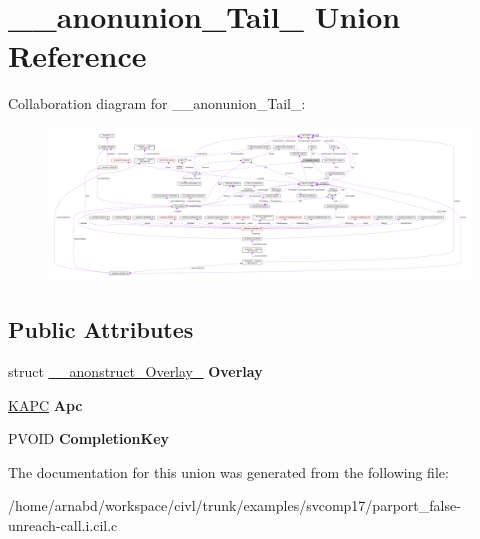 \hypertarget{union____anonunion__Tail__47}{}\section{\+\_\+\+\_\+anonunion\+\_\+\+Tail\+\_ Union Reference}
\label{union____anonunion__Tail__47}


Collaboration diagram for \+\_\+\+\_\+anonunion\+\_\+\+Tail\+\_\+:
\nopagebreak
\begin{figure}[H]
\begin{center}
\leavevmode
\includegraphics[width=350pt]{union____anonunion__Tail__47__coll__graph}
\end{center}
\end{figure}
\subsection*{Public Attributes}
\begin{DoxyCompactItemize}
\item 
\hypertarget{union____anonunion__Tail__47_a921275cd81526fb1bcd5b1021e25bfe4}{}struct \hyperlink{struct____anonstruct__Overlay__48}{\+\_\+\+\_\+anonstruct\+\_\+\+Overlay\+\_} {\bfseries Overlay}\label{union____anonunion__Tail__47_a921275cd81526fb1bcd5b1021e25bfe4}

\item 
\hypertarget{union____anonunion__Tail__47_aed65b12c9b60563abde1723652316ad5}{}\hyperlink{struct__KAPC}{K\+A\+P\+C} {\bfseries Apc}\label{union____anonunion__Tail__47_aed65b12c9b60563abde1723652316ad5}

\item 
\hypertarget{union____anonunion__Tail__47_af0c56526c8a2238a4a7c942bae9eacd7}{}P\+V\+O\+I\+D {\bfseries Completion\+Key}\label{union____anonunion__Tail__47_af0c56526c8a2238a4a7c942bae9eacd7}

\end{DoxyCompactItemize}


The documentation for this union was generated from the following file\+:\begin{DoxyCompactItemize}
\item 
/home/arnabd/workspace/civl/trunk/examples/svcomp17/parport\+\_\+false-\/unreach-\/call.\+i.\+cil.\+c\end{DoxyCompactItemize}
